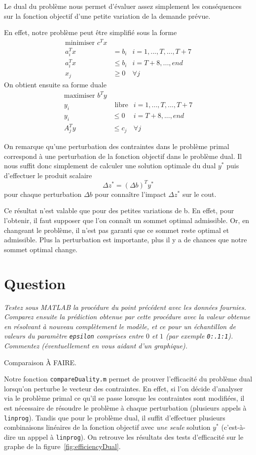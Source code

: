 \documentclass[12pt,oneside,a4paper]{article}
\newcommand{\question}
{
\addtocounter{section}{1}
\section*{Question \thesection}
}
\begin{document}
Le dual du problème nous permet d'évaluer assez simplement
les conséquences sur la fonction objectif
d'une petite variation de la demande prévue.

En effet, notre problème peut être simplifié sous la forme
\begin{align*} 
	\text{minimiser } c^T x \\
	a_i^T x &= b_i  & i = 1,...,T,...,T+7 \\
  a_i^T x &\leq b_i & i = T+8,...,end \\
	x_j &\geq 0 & \forall j
\end{align*}
On obtient ensuite sa forme duale
\begin{align*} 
	\text{maximiser } b^T y \\
	y_i &\text{ libre} & i = 1,...,T,...,T+7 \\
  y_i &\leq 0 & i = T+8,...,end \\
  A_j^T y &\leq c_j & \forall j
\end{align*}

On remarque qu'une perturbation des contraintes dans le problème primal
correspond à une perturbation de la fonction objectif dans le problème dual.
Il nous suffit donc simplement de calculer une solution optimale du dual $y^{*}$
puis d'effectuer le produit scalaire
\[ \Delta z^{*} = (\Delta b)^T y^{*} \]
pour chaque perturbation $\Delta b$ pour conna\^itre l'impact $\Delta z^{*}$
sur le cout.

Ce résultat n'est valable que pour des petites variations de b.
En effet, pour l'obtenir, il faut supposer que l'on connaît un sommet optimal admissible.
Or, en changeant le problème, il n'est pas garanti que ce sommet reste optimal et admissible. 
Plus la perturbation est importante, plus il y a de chances que notre sommet optimal change.

\question %
\emph{Testez sous MATLAB la procédure du point précédent avec les données
fournies. Comparez ensuite la prédiction obtenue par cette procédure
avec la valeur obtenue en résolvant à nouveau complètement le modèle,
et ce pour un échantillon de valeurs du paramètre \texttt{epsilon} comprises
entre $0$ et $1$ (par exemple \texttt{0:.1:1}). 
Commentez (éventuellement en vous aidant d'un graphique).}

Comparaison À FAIRE.

Notre fonction \texttt{compareDuality.m} permet de prouver l'efficacité
du problème dual lorsqu'on perturbe le vecteur des contraintes.
En effet, si l'on décide d'analyser via le problème primal ce qu'il 
se passe lorsque les contraintes sont modifiées, il est nécessaire de 
résoudre le problème à chaque perturbation 
(plusieurs appels à \texttt{linprog}).
Tandis que pour le problème dual,
il suffit d'effectuer plusieurs combinaisons linéaires de la fonction objectif
avec \emph{une seule} solution $y^{*}$ 
(c'est-à-dire un apppel à \texttt{linprog}).
On retrouve les résultats des tests d'efficacité
sur le graphe de la figure~\ref{fig:efficiencyDual}. 
\end{document}
